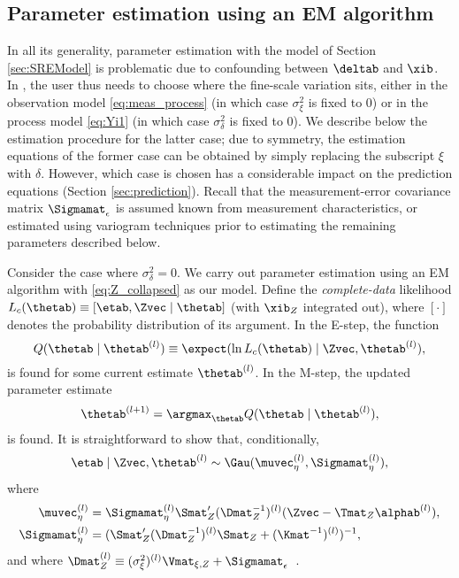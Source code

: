 \subsection{Parameter estimation using an EM algorithm} \label{sec:estimation}

In all its generality, parameter estimation with the model of Section \ref{sec:SREModel} is problematic due to confounding between $\deltab$ and $\xib$. In , the user thus needs to choose where the fine-scale variation sits, either in the observation model \eqref{eq:meas_process} (in which case $\sigma^2_\xi$ is fixed to 0) or in the process model \eqref{eq:Yi1} (in which case $\sigma^2_\delta$ is fixed to 0). We describe below the estimation procedure for the latter case; due to symmetry, the estimation equations of the former case can be obtained by simply replacing the subscript $\xi$ with $\delta$. However, which case is chosen has a considerable impact on the prediction equations (Section \ref{sec:prediction}). Recall that the measurement-error covariance matrix $\Sigmamat_\epsilon$ is assumed known from measurement characteristics, or estimated using variogram techniques prior to estimating the remaining parameters described below.

Consider the case where $\sigma^2_\delta = 0$. We carry out parameter estimation using an EM algorithm \citep{Katzfuss_2011,Nguyen_2014} with \eqref{eq:Z_collapsed} as our model. Define the \emph{complete-data} likelihood $L_c(\thetab) \equiv [\etab,\Zvec \mid \thetab]$ (with $\xib_Z$ integrated out), where $[\cdot]$ denotes the probability distribution of its argument. In the E-step, the function
\begin{equation}
Q(\thetab \mid \thetab^{(l)}) \equiv \expect(\ln L_c(\thetab) \mid \Zvec,\thetab^{(l)}),
\end{equation}
is found for some current estimate $\thetab^{(l)}$. In the M-step, the updated parameter estimate
\begin{equation}
\thetab^{(l+1)} = \argmax_\thetab Q(\thetab \mid \thetab^{(l)}),
\end{equation}
is found. It is straightforward to show that, conditionally,
\begin{equation}
\etab \mid \Zvec,\thetab^{(l)} \sim \Gau(\muvec_\eta^{(l)},\Sigmamat_\eta^{(l)}),
\end{equation}
where
\begin{align}
\muvec_\eta^{(l)} &= \Sigmamat_\eta^{(l)} \Smat_Z'(\Dmat_Z^{-1})^{(l)}(\Zvec - \Tmat_Z\alphab^{(l)}), \\
\Sigmamat_\eta^{(l)} &= (\Smat_Z'(\Dmat_Z^{-1})^{(l)}\Smat_Z + (\Kmat^{-1})^{(l)})^{-1},
\end{align}
and where $\Dmat_Z^{(l)} \equiv (\sigma^2_\xi)^{(l)} \Vmat_{\xi,Z} + \Sigmamat_\epsilon$~.

